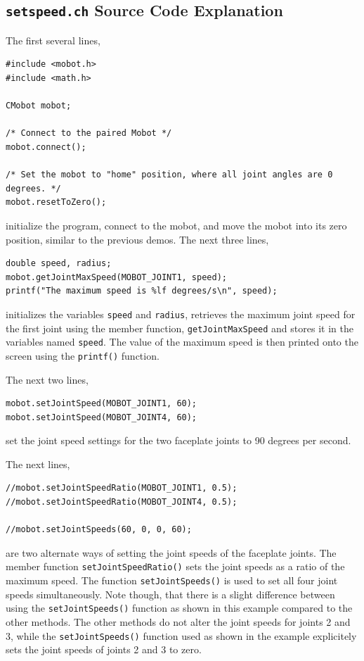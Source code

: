 \documentclass{article}
\begin{document}
\subsection{\texttt{setspeed.ch} Source Code Explanation}
The first several lines,
\begin{verbatim}
#include <mobot.h>
#include <math.h>

CMobot mobot;

/* Connect to the paired Mobot */
mobot.connect();

/* Set the mobot to "home" position, where all joint angles are 0 degrees. */
mobot.resetToZero();
\end{verbatim}
initialize the program, connect to the mobot, and move the mobot into its zero position,
similar to the previous demos. The next three lines,
\begin{verbatim}
double speed, radius;
mobot.getJointMaxSpeed(MOBOT_JOINT1, speed);
printf("The maximum speed is %lf degrees/s\n", speed);
\end{verbatim}
initializes the variables \texttt{speed} and \texttt{radius},
retrieves the maximum joint speed for the first joint using the member function,
\texttt{getJointMaxSpeed} and stores it in the variables named \texttt{speed}.
The value of the maximum speed is then printed onto the screen using the \texttt{printf()}
function.

The next two lines,
\begin{verbatim}
mobot.setJointSpeed(MOBOT_JOINT1, 60);
mobot.setJointSpeed(MOBOT_JOINT4, 60);
\end{verbatim}
set the joint speed settings for the two faceplate joints to 90 degrees per second.

The next lines, 
\begin{verbatim}
//mobot.setJointSpeedRatio(MOBOT_JOINT1, 0.5);
//mobot.setJointSpeedRatio(MOBOT_JOINT4, 0.5);

//mobot.setJointSpeeds(60, 0, 0, 60);
\end{verbatim}
are two alternate ways of setting the joint speeds of the faceplate joints. 
The member function \texttt{setJointSpeedRatio()} sets the joint speeds as a ratio of the 
maximum speed. The function \texttt{setJointSpeeds()} is used to set all four
joint speeds simultaneously. Note though, that there is a slight difference between
using the \texttt{setJointSpeeds()} function as shown in this example compared to the
other methods. The other methods do not alter the joint speeds for joints 2 and 3, while
the \texttt{setJointSpeeds()} function used as shown in the example explicitely sets
the joint speeds of joints 2 and 3 to zero. 
\end{document}

